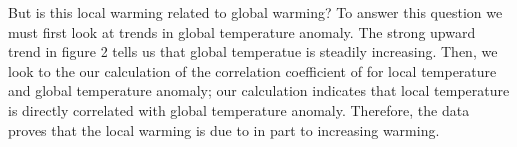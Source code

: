 \documentclass[12pt]{article}
\begin{document}
But is this local warming related to global warming?
To answer this question we must first look at trends in
global temperature anomaly.
The strong upward trend in figure 2 tells us that global temperatue is
steadily increasing.
Then, we look to the our calculation of the correlation coefficient of
for local temperature and global temperature anomaly;
our calculation indicates that local temperature is directly
correlated with global temperature anomaly.
Therefore, the data proves that the local warming is due to in part
to increasing warming.
\end{document}
